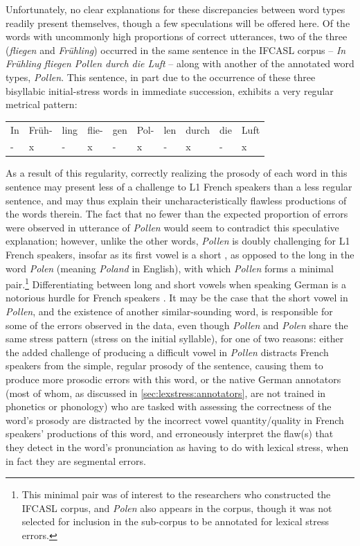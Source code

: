 			Unfortunately, no clear explanations for these discrepancies between word types readily present themselves, though a few speculations will be offered here. Of the words with uncommonly high proportions of correct utterances, two of the three (\textit{fliegen} and \textit{Fr\"{u}hling}) occurred in the same sentence in the IFCASL corpus --  \textit{In Fr\"uhling fliegen Pollen durch die Luft} -- along with another of the annotated word types, \textit{Pollen}. This sentence, in part due to the occurrence of these three bisyllabic initial-stress words in immediate succession, exhibits a very regular metrical pattern:
			\begin{center}
			\begin{tabular}{llllllllll}
			In & Fr\"uh-& ling & flie-& gen & Pol-& len & durch & die & Luft \\
			- & x & - &  x & - & x & - & x & - & x \\
			\end{tabular}
			\end{center}
			As a result of this regularity, correctly realizing the prosody of each word in this sentence may present less of a challenge to L1 French speakers than a less regular sentence, and may thus explain their uncharacteristically flawless productions of the words therein. The fact that no fewer than the expected proportion of errors were observed in utterance of \textit{Pollen} would seem to contradict this speculative explanation; however, unlike the other words, \textit{Pollen} is doubly challenging for L1 French speakers, insofar as its first vowel is a short , as opposed to the long  in the word \textit{Polen} (meaning \textit{Poland} in English), with which \textit{Pollen} forms a minimal pair.\footnote{This minimal pair was of interest to the researchers who constructed the IFCASL corpus, and \textit{Polen} also appears in the corpus, though it was not selected for inclusion in the sub-corpus to be annotated for lexical stress errors.}  Differentiating between long and short vowels when speaking German is a notorious hurdle for French speakers . It may be the case that the short vowel in \textit{Pollen}, and the existence of another similar-sounding word, is responsible for some of the errors observed in the data, even though \textit{Pollen} and \textit{Polen} share the same stress pattern (stress on the initial syllable), for one of two reasons: either the added challenge of producing a difficult vowel in \textit{Pollen} distracts French speakers from the simple, regular prosody of the sentence, causing them to produce more prosodic errors with this word, or the native German annotators (most of whom, as discussed in \cref{sec:lexstress:annotators}, are not trained in phonetics or phonology) who are tasked with assessing the correctness of the word's prosody are distracted by the incorrect vowel quantity/quality in French speakers' productions of this word, and erroneously interpret the flaw(s) that they detect in the word's pronunciation as having to do with lexical stress, when in fact they are segmental errors. 
